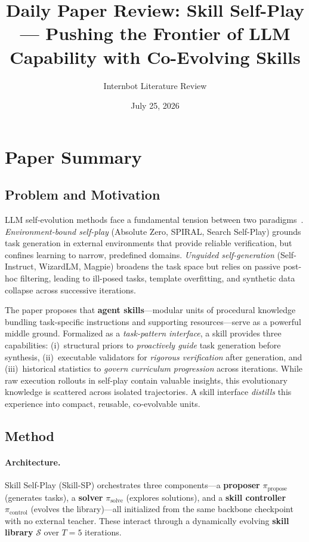 \documentclass[11pt,a4paper]{article}
\title{Daily Paper Review: Skill Self-Play --- Pushing the Frontier of LLM Capability with Co-Evolving Skills}
\author{Internbot Literature Review}
\date{July 25, 2026}
\begin{document}
\maketitle

\section{Paper Summary}

\subsection{Problem and Motivation}

LLM self-evolution methods face a fundamental tension between two paradigms~\cite{huang2026skillsp}. \emph{Environment-bound self-play} (Absolute Zero, SPIRAL, Search Self-Play) grounds task generation in external environments that provide reliable verification, but confines learning to narrow, predefined domains. \emph{Unguided self-generation} (Self-Instruct, WizardLM, Magpie) broadens the task space but relies on passive post-hoc filtering, leading to ill-posed tasks, template overfitting, and synthetic data collapse across successive iterations.

The paper proposes that \textbf{agent skills}---modular units of procedural knowledge bundling task-specific instructions and supporting resources---serve as a powerful middle ground. Formalized as a \emph{task-pattern interface}, a skill provides three capabilities: (i)~structural priors to \emph{proactively guide} task generation before synthesis, (ii)~executable validators for \emph{rigorous verification} after generation, and (iii)~historical statistics to \emph{govern curriculum progression} across iterations. While raw execution rollouts in self-play contain valuable insights, this evolutionary knowledge is scattered across isolated trajectories. A skill interface \emph{distills} this experience into compact, reusable, co-evolvable units.

\subsection{Method}

\paragraph{Architecture.}
Skill Self-Play (Skill-SP) orchestrates three components---a \textbf{proposer} $\pi_{\text{propose}}$ (generates tasks), a \textbf{solver} $\pi_{\text{solve}}$ (explores solutions), and a \textbf{skill controller} $\pi_{\text{control}}$ (evolves the library)---all initialized from the same backbone checkpoint with no external teacher. These interact through a dynamically evolving \textbf{skill library} $\mathcal{S}$ over $T=5$ iterations.
\end{document}
